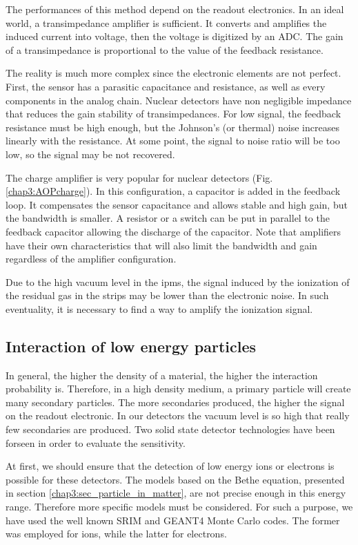 \begin{refsection}
  The performances of this method depend on the readout electronics. In an ideal world, a transimpedance amplifier is sufficient. It converts and amplifies the induced current into voltage, then the voltage is digitized by an ADC. The gain of a transimpedance is proportional to the value of the feedback resistance.

  The reality is much more complex since the electronic elements are not perfect. First, the sensor has a parasitic capacitance and resistance, as well as every components in the analog chain. Nuclear detectors have non negligible impedance that reduces the gain stability of transimpedances.
  For low signal, the feedback resistance must be high enough, but the Johnson’s (or thermal) noise increases linearly with the resistance. At some point, the signal to noise ratio will be too low, so the signal may be not recovered.

  The charge amplifier is very popular for nuclear detectors (Fig. \ref{chap3:AOPcharge}). In this configuration, a capacitor is added in the feedback loop. It compensates the sensor capacitance and allows stable and high gain, but the bandwidth is smaller. A resistor or a switch can be put in parallel to the feedback capacitor allowing the discharge of the capacitor. Note that amplifiers have their own characteristics that will also limit the bandwidth and gain regardless of the amplifier configuration.

  

  Due to the high vacuum level in the \acrshort{ipm}s, the signal induced by the ionization of the residual gas in the strips may be lower than the  electronic noise. In such eventuality, it is necessary to find a way to amplify the ionization signal.

  \subsection{Interaction of low energy particles}
  \label{chap3:low_energy}
  In general, the higher the density of a material, the higher the interaction probability is. Therefore, in a high density medium, a primary particle will create many secondary particles. The more secondaries produced, the higher the signal on the readout electronic. In our detectors the vacuum level is so high that really few secondaries are produced. Two solid state detector technologies have been forseen in order to evaluate the sensitivity.

  At first, we should ensure that the detection of low energy ions or electrons is possible for these detectors. The models based on the Bethe equation, presented in section \ref{chap3:sec_particle_in_matter}, are not precise enough in this energy range. Therefore more specific models must be considered. For such a purpose, we have used the well known SRIM and GEANT4 Monte Carlo codes. The former was employed for ions, while the latter for electrons.


\end{refsection}
